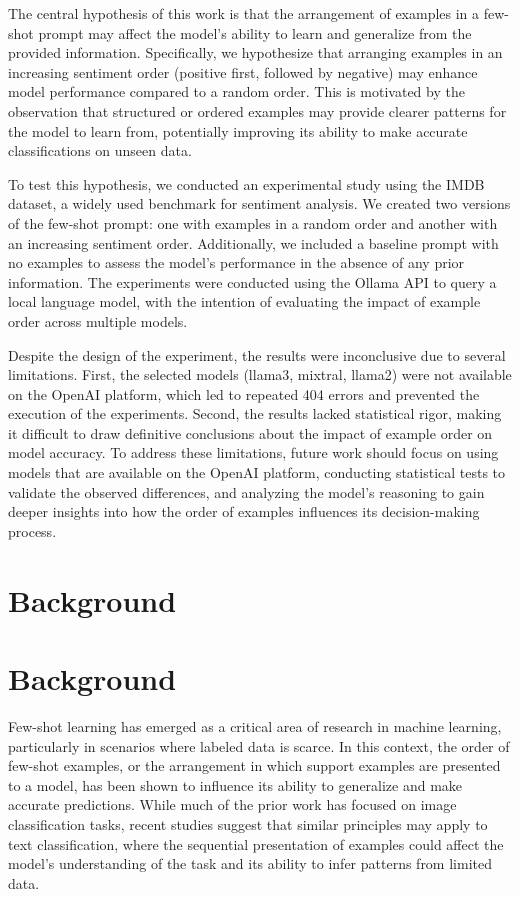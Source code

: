 \documentclass{article}
\begin{document}
The central hypothesis of this work is that the arrangement of examples in a few-shot prompt may affect the model's ability to learn and generalize from the provided information. Specifically, we hypothesize that arranging examples in an increasing sentiment order (positive first, followed by negative) may enhance model performance compared to a random order. This is motivated by the observation that structured or ordered examples may provide clearer patterns for the model to learn from, potentially improving its ability to make accurate classifications on unseen data. 

To test this hypothesis, we conducted an experimental study using the IMDB dataset, a widely used benchmark for sentiment analysis. We created two versions of the few-shot prompt: one with examples in a random order and another with an increasing sentiment order. Additionally, we included a baseline prompt with no examples to assess the model's performance in the absence of any prior information. The experiments were conducted using the Ollama API to query a local language model, with the intention of evaluating the impact of example order across multiple models. 

Despite the design of the experiment, the results were inconclusive due to several limitations. First, the selected models (llama3, mixtral, llama2) were not available on the OpenAI platform, which led to repeated 404 errors and prevented the execution of the experiments. Second, the results lacked statistical rigor, making it difficult to draw definitive conclusions about the impact of example order on model accuracy. To address these limitations, future work should focus on using models that are available on the OpenAI platform, conducting statistical tests to validate the observed differences, and analyzing the model's reasoning to gain deeper insights into how the order of examples influences its decision-making process.
\section{Background}
\section{Background}

Few-shot learning has emerged as a critical area of research in machine learning, particularly in scenarios where labeled data is scarce. In this context, the order of few-shot examples, or the arrangement in which support examples are presented to a model, has been shown to influence its ability to generalize and make accurate predictions. While much of the prior work has focused on image classification tasks, recent studies suggest that similar principles may apply to text classification, where the sequential presentation of examples could affect the model's understanding of the task and its ability to infer patterns from limited data.
\end{document}
